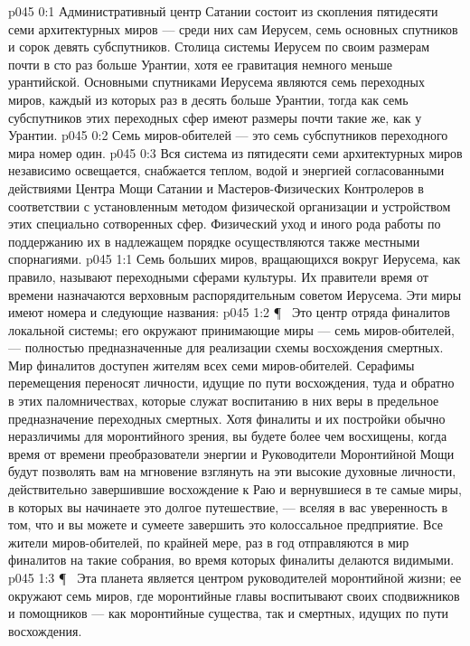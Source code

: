 \author{Мелхиседек}
\vs p045 0:1 Административный центр Сатании состоит из скопления пятидесяти семи архитектурных миров --- среди них сам Иерусем, семь основных спутников и сорок девять субспутников. Столица системы Иерусем по своим размерам почти в сто раз больше Урантии, хотя ее гравитация немного меньше урантийской. Основными спутниками Иерусема являются семь переходных миров, каждый из которых раз в десять больше Урантии, тогда как семь субспутников этих переходных сфер имеют размеры почти такие же, как у Урантии.
\vs p045 0:2 Семь миров\hyp{}обителей --- это семь субспутников переходного мира номер один.
\vs p045 0:3 Вся система из пятидесяти семи архитектурных миров независимо освещается, снабжается теплом, водой и энергией согласованными действиями Центра Мощи Сатании и Мастеров\hyp{}Физических Контролеров в соответствии с установленным методом физической организации и устройством этих специально сотворенных сфер. Физический уход и иного рода работы по поддержанию их в надлежащем порядке осуществляются также местными спорнагиями.
\vs p045 1:1 Семь больших миров, вращающихся вокруг Иерусема, как правило, называют переходными сферами культуры. Их правители время от времени назначаются верховным распорядительным советом Иерусема. Эти миры имеют номера и следующие названия:
\vs p045 1:2 \P\  Это центр отряда финалитов локальной системы; его окружают принимающие миры --- семь миров\hyp{}обителей, --- полностью предназначенные для реализации схемы восхождения смертных. Мир финалитов доступен жителям всех семи миров\hyp{}обителей. Серафимы перемещения переносят личности, идущие по пути восхождения, туда и обратно в этих паломничествах, которые служат воспитанию в них веры в предельное предназначение переходных смертных. Хотя финалиты и их постройки обычно неразличимы для моронтийного зрения, вы будете более чем восхищены, когда время от времени преобразователи энергии и Руководители Моронтийной Мощи будут позволять вам на мгновение взглянуть на эти высокие духовные личности, действительно завершившие восхождение к Раю и вернувшиеся в те самые миры, в которых вы начинаете это долгое путешествие, --- вселяя в вас уверенность в том, что и вы можете и сумеете завершить это колоссальное предприятие. Все жители миров\hyp{}обителей, по крайней мере, раз в год отправляются в мир финалитов на такие собрания, во время которых финалиты делаются видимыми.
\vs p045 1:3 \P\  Эта планета является центром руководителей моронтийной жизни; ее окружают семь миров, где моронтийные главы воспитывают своих сподвижников и помощников --- как моронтийные существа, так и смертных, идущих по пути восхождения.

